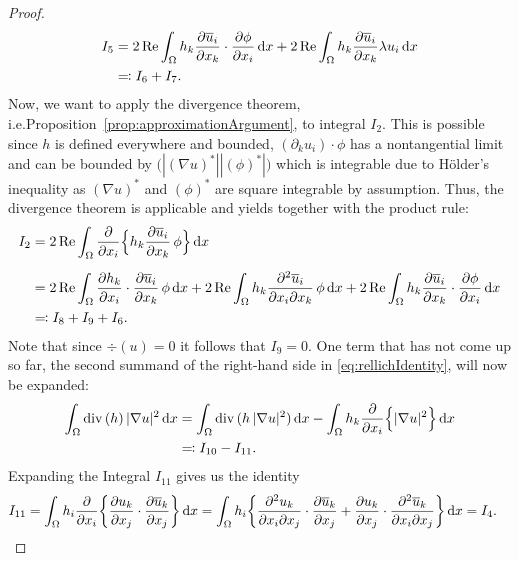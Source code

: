 \begin{proof}
\begin{align*}
     I_5 
     &= 2 \operatorname{Re} \int_\Omega h_k \frac{\partial \overline u_i}{\partial x_k}\cdot  \frac{\partial \phi}{\partial x_i} \, {\operatorname{d}\!{x}} + 2\operatorname{Re} \int_\Omega h_k \frac{\partial\overline u_i}{\partial x_k} \lambda u_i \, {\operatorname{d}\!{x}} \\
     &\eqqcolon I_6 + I_7 .
  \end{align*}
  Now, we want to apply the divergence theorem, i.e.\@ Proposition~\ref{prop:approximationArgument}, to integral $I_2$.
  This is possible since $h$ is defined everywhere and bounded, $(\partial_k u_i) \cdot \phi$ has a nontangential limit and can be bounded by $\big( |(\nabla u)^*| |(\phi)^*| \big)$ which is integrable due to Hölder's inequality as $(\nabla u)^*$ and $(\phi)^*$ are square integrable by assumption.
  Thus, the divergence theorem is applicable and yields together with the product rule:
  \begin{align*}
    I_2
    &= 2 \operatorname{Re} \int_\Omega \frac{\partial}{\partial x_i} \Big\{ h_k \frac{\partial \overline u_i}{\partial x_k} \, \phi \Big\} \, {\operatorname{d}\!{x}} \\[0.5em]
    &= 2 \operatorname{Re} \int_\Omega \frac{\partial h_k}{\partial x_i} \cdot \frac{\partial \overline u_i}{\partial x_k} \, \phi \, {\operatorname{d}\!{x}} + 2 \operatorname{Re} \int_\Omega h_k \frac{\partial^2 \overline u_i}{\partial x_i \partial x_k} \, \phi \, {\operatorname{d}\!{x}} + 2 \operatorname{Re} \int_\Omega h_k \frac{\partial \overline u_i}{\partial x_k} \cdot \frac{\partial \phi}{\partial x_i} \, {\operatorname{d}\!{x}}\\
    &\eqqcolon I_8 + I_9 + I_6.
  \end{align*}
  Note that since $\div(u) = 0$ it follows that $I_9 = 0$.
  One term that has not come up so far, the second summand of the right-hand side in \eqref{eq:rellichIdentity}, will now be expanded:
  \begin{align*}
    \int_\Omega \mathrm{div\,} (h)\,  |\nabla u|^2 \, {\operatorname{d}\!{x}}
    &= \int_\Omega \mathrm{div\,} ( h\,|\nabla u|^2) \, {\operatorname{d}\!{x}} - \int_\Omega h_k \frac{\partial}{\partial x_i} \Big\{ |\nabla u|^2 \Big\} \, {\operatorname{d}\!{x}} \\
    &\eqqcolon I_{10} - I_{11}.
  \end{align*}
  Expanding the Integral $I_{11}$ gives us the identity
  \begin{align*}
    I_{11}
    &= \int_\Omega h_i \frac{\partial}{\partial x_i} \bigg\{ \frac{\partial u_k}{\partial x_j} \cdot \frac{\partial \overline u_k}{\partial x_j} \bigg\} \d x
    = \int_\Omega h_i  \bigg\{ \frac{\partial^2 u_k}{\partial x_i \partial x_j} \cdot \frac{\partial \overline u_k}{\partial x_j} + \frac{\partial u_k}{\partial x_j} \cdot \frac{\partial^2 \overline u_k}{\partial x_i \partial x_j} \bigg\} \d x= I_4.

\end{align*}
\end{proof}
